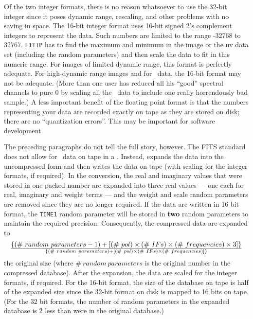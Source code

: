     Of the two integer formats, there is no reason whatsoever to use
the 32-bit integer since it poses dynamic range, rescaling, and other
problems with no saving in space.  The 16-bit integer format uses
16-bit signed 2's complement integers to represent the data.  Such
numbers are limited to the range -32768 to 32767.  {\tt FITTP} has to
find the maximum and minimum in the image or the uv data set
(including the random parameters) and then scale the data to fit in
this numeric range.  For images of limited dynamic range, this format
is perfectly adequate.  For high-dynamic range images and for \uv\
data, the 16-bit format may not be adequate.  (More than one user has
reduced all his ``good'' spectral channels to pure 0 by scaling all
the \uv\ data to include one really horrendously bad sample.)
A less important benefit of the floating point format is that the
numbers representing your data are recorded exactly on tape as they
are stored on disk; there are no ``quantization errors''.  This may be
important for software development.

     The preceding paragraphs do not tell the full story, however.
The FITS standard does not allow for \uv\ data on tape in a
. Instead, {\tt {}} expands the data
into the uncompressed form and then writes the data on tape (with
scaling for the integer formats, if required).  In the conversion, the
real and imaginary values that were stored in one packed number are
expanded into three real values --- one each for real, imaginary and
weight terms --- and the weight and scale random parameters are
removed since they are no longer required.  If the data are written in
16 bit format, the {\tt TIME1} random parameter will be stored in {\bf
two} random parameters to maintain the required precision.
Consequently, the compressed data are expanded to
$$
    \lbrace (\#~random~parameters - 1 ) + \lbrack (\#~pol) \times
        (\#~IFs) \times (\#~frequencies) \times 3 \rbrack \rbrace
      \over
     \lbrace (\#~random~parameters) + \lbrack (\#~pol) \times (\#~IFs)
       \times (\#~frequencies) \rbrack \rbrace
$$
the original size  (where $\#~random~parameters$ is the original
number in the compressed database).  After the expansion, the data are
scaled for the integer formats, if required.  For the 16-bit format,
the size of the database on tape is half of the expanded size since
the 32-bit format on disk is mapped to 16 bits on tape.  (For the 32
bit formats, the number of random parameters in the expanded database
is 2 less than were in the original database.)

